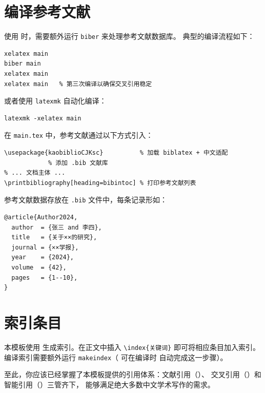 
\section{编译参考文献}

使用  时，需要额外运行 \texttt{biber} 来处理参考文献数据库。
典型的编译流程如下：

\begin{lstlisting}[style=kaolstplain]
xelatex main
biber main
xelatex main
xelatex main   % 第三次编译以确保交叉引用稳定
\end{lstlisting}

或者使用 \texttt{latexmk} 自动化编译：

\begin{lstlisting}[style=kaolstplain]
latexmk -xelatex main
\end{lstlisting}

在 \texttt{main.tex} 中，参考文献通过以下方式引入：

\begin{lstlisting}
\usepackage{kaobiblioCJKsc}          % 加载 biblatex + 中文适配
            % 添加 .bib 文献库
% ... 文档主体 ...
\printbibliography[heading=bibintoc] % 打印参考文献列表
\end{lstlisting}

参考文献数据存放在 \texttt{.bib} 文件中，每条记录形如：

\begin{lstlisting}
@article{Author2024,
  author  = {张三 and 李四},
  title   = {关于××的研究},
  journal = {××学报},
  year    = {2024},
  volume  = {42},
  pages   = {1--10},
}
\end{lstlisting}


\section{索引条目}

本模板使用  生成索引。在正文中插入
\lstinline|\index{关键词}| 即可将相应条目加入索引。
编译索引需要额外运行 \texttt{makeindex}（ 可在编译时
自动完成这一步骤）。

至此，你应该已经掌握了本模板提供的引用体系：文献引用（）、
交叉引用（）和智能引用（）三管齐下，
能够满足绝大多数中文学术写作的需求。
